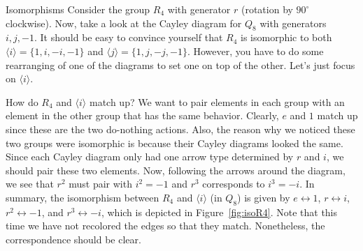 \begin{section}{Isomorphisms}
Consider the group $R_4$ with generator $r$ (rotation by $90^\circ$ clockwise).  Now, take a look at the Cayley diagram for $Q_8$ with generators $i, j, -1$.  It should be easy to convince yourself that $R_4$ is isomorphic to both $\langle i\rangle=\{1,i,-i,-1\}$ and $\langle j\rangle=\{1,j,-j,-1\}$.  However, you have to do some rearranging of one of the diagrams to set one on top of the other.  Let's just focus on $\langle i\rangle$.  

How do $R_4$ and $\langle i\rangle$ match up?  We want to pair elements in each group with an element in the other group that has the same behavior.  Clearly, $e$ and $1$ match up since these are the two do-nothing actions.  Also, the reason why we noticed these two groups were isomorphic is because their Cayley diagrams looked the same.  Since each Cayley diagram only had one arrow type determined by $r$ and $i$, we should pair these two elements.  Now, following the arrows around the diagram, we see that $r^2$ must pair with $i^2=-1$ and $r^3$ corresponds to $i^3=-i$.  In summary, the isomorphism between $R_4$ and $\langle i\rangle$ (in $Q_8$) is given by $e\leftrightarrow 1$, $r\leftrightarrow i$, $r^2\leftrightarrow -1$, and $r^3\leftrightarrow -i$, which is depicted in Figure~\ref{fig:isoR4}. Note that this time we have not recolored the edges so that they match.  Nonetheless, the correspondence should be clear.

\begin{figure}[!ht]
\centering
{}
\end{figure}
\end{section}
